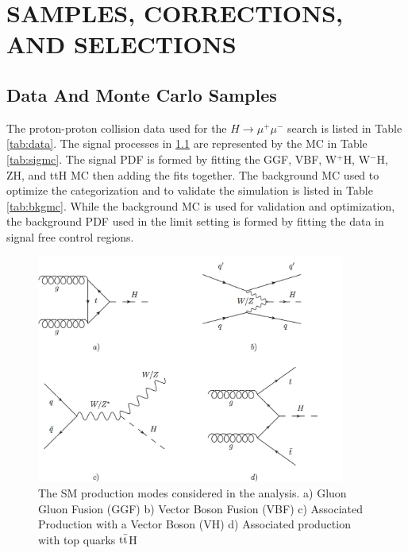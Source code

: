 \chapter{SAMPLES, CORRECTIONS, AND SELECTIONS} \label{samples}

\section{Data And Monte Carlo Samples}

The proton-proton collision data used for the $H\rightarrow\mu^+\mu^-$ search is listed in Table \ref{tab:data}. The signal processes in \ref{fig:hfeynprod2} are represented by the MC in Table \ref{tab:sigmc}. The signal PDF is formed by fitting the GGF, VBF, W$^+$H, W$^-$H, ZH, and ttH MC then adding the fits together. The background MC used to optimize the categorization and to validate the simulation is listed in Table \ref{tab:bkgmc}. While the background MC is used for validation and optimization, the background PDF used in the limit setting is formed by fitting the data in signal free control regions. 

\begin{figure}[h!]
  \centering
  \includegraphics[width=4in]{images/higgs_production_modes.png}
  \caption[Standard Model Higgs boson production modes.]
   {The SM production modes considered in the analysis. a) Gluon Gluon Fusion (GGF) b) Vector Boson Fusion (VBF) c) Associated Production with a Vector Boson (VH) d) Associated production with top quarks ${\rm t\bar{t}}$H}
  \label{fig:hfeynprod2}
\end{figure}

